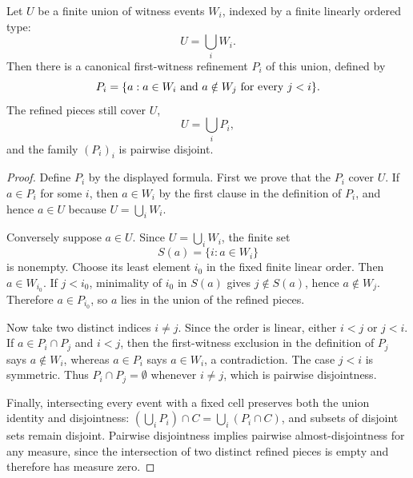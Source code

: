 \begin{helper}
Let \(U\) be a finite union of witness events \(W_i\), indexed by a finite
linearly ordered type:
\[
  U=\bigcup_i W_i .
\]
Then there is a canonical first-witness refinement \(P_i\) of this union,
defined by
\[
  P_i=\{a:a\in W_i\hbox{ and }a\notin W_j\hbox{ for every }j<i\}.
\]
The refined pieces still cover \(U\),
\[
  U=\bigcup_i P_i,
\]
and the family \((P_i)_i\) is pairwise disjoint.
\end{helper}
\begin{proof}
Define \(P_i\) by the displayed formula.  First we prove that the \(P_i\)
cover \(U\).  If \(a\in P_i\) for some \(i\), then \(a\in W_i\) by the first
clause in the definition of \(P_i\), and hence \(a\in U\) because
\(U=\bigcup_i W_i\).

Conversely suppose \(a\in U\).  Since \(U=\bigcup_i W_i\), the finite set
\[
  S(a)=\{i:a\in W_i\}
\]
is nonempty.  Choose its least element \(i_0\) in the fixed finite linear
order.  Then \(a\in W_{i_0}\).  If \(j<i_0\), minimality of \(i_0\) in
\(S(a)\) gives \(j\notin S(a)\), hence \(a\notin W_j\).  Therefore
\(a\in P_{i_0}\), so \(a\) lies in the union of the refined pieces.

Now take two distinct indices \(i\ne j\).  Since the order is linear, either
\(i<j\) or \(j<i\).  If \(a\in P_i\cap P_j\) and \(i<j\), then the
first-witness exclusion in the definition of \(P_j\) says \(a\notin W_i\),
whereas \(a\in P_i\) says \(a\in W_i\), a contradiction.  The case \(j<i\)
is symmetric.  Thus \(P_i\cap P_j=\emptyset\) whenever \(i\ne j\), which is
pairwise disjointness.

Finally, intersecting every event with a fixed cell preserves both the union
identity and disjointness: \((\bigcup_i P_i)\cap C=\bigcup_i(P_i\cap C)\),
and subsets of disjoint sets remain disjoint.  Pairwise disjointness implies
pairwise almost-disjointness for any measure, since the intersection of two
distinct refined pieces is empty and therefore has measure zero.
\end{proof}
